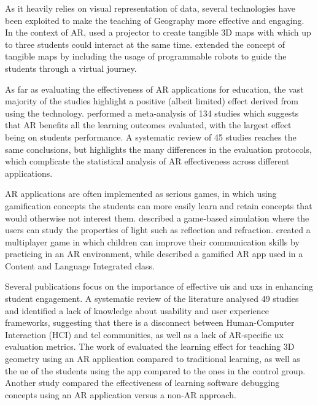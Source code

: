 \documentclass[pdflatex,sn-basic,iicol]{sn-jnl}%
\begin{document}
As it heavily relies on visual representation of data, several technologies have been exploited to make the teaching of Geography more effective and engaging. In the context of AR, \cite{palaigeorgiou2018touching} used a projector to create tangible 3D maps with which up to three students could interact at the same time. \cite{xefteris2019mixing} extended the concept of tangible maps by including the usage of programmable robots to guide the students through a virtual journey.

As far as evaluating the effectiveness of AR applications for education, the vast majority of the studies highlight a positive (albeit limited) effect derived from using the technology. \cite{CHANG2022104641} performed a meta-analysis of 134 studies which suggests that AR benefits all the learning outcomes evaluated, with the largest effect being on students performance. A systematic review of 45 studies \citep{da2019perspectives} reaches the same conclusions, but highlights the many differences in the evaluation protocols, which complicate the statistical analysis of AR effectiveness across different applications.

AR applications are often implemented as serious games, in which using gamification concepts the students can more easily learn and retain concepts that would otherwise not interest them. \cite{oh2017hybrid} described a game-based simulation where the users can study the properties of light such as reflection and refraction. \cite{lopez2020emofindar} created a multiplayer game in which children can improve their communication skills by practicing in an AR environment, while \cite{ccelik2022use} described a gamified AR app used in a Content and Language Integrated class.

Several publications focus on the importance of effective \glspl{ui} and \glspl{ux} in enhancing student engagement. A systematic review of the literature analysed 49 studies \citep{LAW2021100321} and identified a lack of knowledge about usability and user experience frameworks, suggesting that there is a disconnect between Human-Computer Interaction (HCI) and \gls{tel} communities, as well as a lack of AR-specific \gls{ux} evaluation metrics.
The work of \cite{thamrongrat2019design} evaluated the learning effect for teaching 3D geometry using an AR application compared to traditional learning, as well as the \gls{ue} of the students using the app compared to the ones in the control group. Another study \citep{alrashidi2017evaluating} compared the effectiveness of learning software debugging concepts using an AR application versus a non-AR approach.
\end{document}

